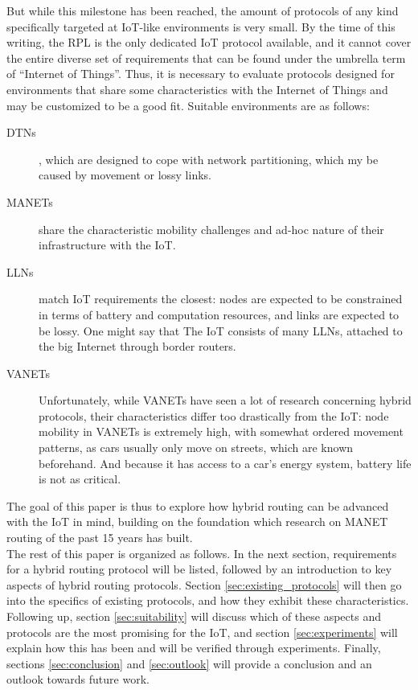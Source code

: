 \documentclass[a4paper,10pt]{scrartcl}
\begin{document}
But while this milestone has been reached, the amount of protocols of any kind specifically targeted at IoT-like environments is very small. By the time of this writing, the \gls{RPL} is the only dedicated IoT protocol available, and it cannot cover the entire diverse set of requirements that can be found under the umbrella term of ``Internet of Things''. Thus, it is necessary to evaluate protocols designed for environments that share some characteristics with the Internet of Things and may be customized to be a good fit. Suitable environments are as follows:
\begin{description}
\item[\glspl{DTN}], which are designed to cope with network partitioning, which my be caused by movement or lossy links.
\item[\glspl{MANET}] share the characteristic mobility challenges and ad-hoc nature of their infrastructure with the IoT.
\item[\glspl{LLN}] match IoT requirements the closest: nodes are expected to be constrained in terms of battery and computation resources, and links are expected to be lossy. One might say that The IoT consists of many LLNs, attached to the big Internet through border routers.
\item[\glspl{VANET}] Unfortunately, while \glspl{VANET} have seen a lot of research concerning hybrid protocols, their characteristics differ too drastically from the IoT: node mobility in VANETs is extremely high, with somewhat ordered movement patterns, as cars usually only move on streets, which are known beforehand. And because it has access to a car's energy system, battery life is not as critical.
\end{description}

The goal of this paper is thus to explore how hybrid routing can be advanced with the \gls{IoT} in mind, building on the foundation which research on \gls{MANET} routing of the past 15 years has built.\\ 
The rest of this paper is organized as follows. %
In the next section, requirements for a hybrid routing protocol will be listed, followed by an introduction to key aspects of hybrid routing protocols. Section \ref{sec:existing_protocols} will then go into the specifics of existing protocols, and how they exhibit these characteristics. Following up, section \ref{sec:suitability} will discuss which of these aspects and protocols are the most promising for the IoT, and section \ref{sec:experiments} will explain how this has been and will be verified through experiments. Finally, sections \ref{sec:conclusion} and \ref{sec:outlook} will provide a conclusion and an outlook towards future work.
\end{document}
